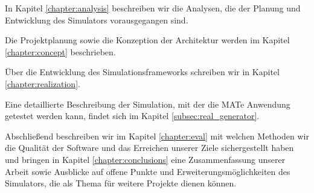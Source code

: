 In Kapitel \ref{chapter:analysis} beschreiben wir die Analysen, die der Planung und Entwicklung des Simulators vorausgegangen sind.

Die Projektplanung sowie die Konzeption der Architektur werden im Kapitel \ref{chapter:concept} beschrieben.

Über die Entwicklung des Simulationsframeworks schreiben wir in Kapitel \ref{chapter:realization}.

Eine detaillierte Beschreibung der Simulation, mit der die MATe Anwendung getestet werden kann, findet sich im Kapitel \ref{subsec:real_generator}.

Abschließend beschreiben wir im Kapitel \ref{chapter:eval} mit welchen Methoden wir die Qualität der Software und das Erreichen unserer Ziele sichergestellt haben und bringen in Kapitel \ref{chapter:conclusions} eine Zusammenfassung unserer Arbeit sowie Ausblicke auf offene Punkte und Erweiterungsmöglichkeiten des Simulators, die als Thema für weitere Projekte dienen können.


